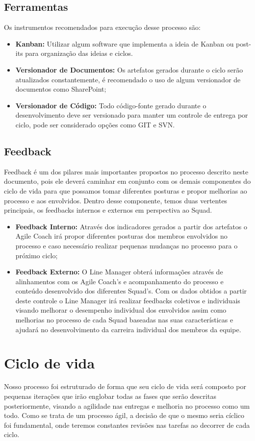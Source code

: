 \documentclass[	DIV=calc,%
							paper=a4,%
							fontsize=12pt,%
							onecolumn]{scrartcl}	 					%
\begin{document}
\subsection{Ferramentas}
Os instrumentos recomendados para execução desse processo são:
\begin{itemize}
	\item \textbf{Kanban:} Utilizar algum software que implementa a ideia de Kanban ou post-its para organização das ideias e ciclos.
	\item \textbf{Versionador de Documentos:} Os artefatos gerados durante o ciclo serão atualizados constantemente, é recomendado o uso de algum versionador de documentos como SharePoint; 
	\item \textbf{Versionador de Código:} Todo código-fonte gerado durante o desenvolvimento deve ser versionado para manter um controle de entrega por ciclo, pode ser considerado opções como GIT e SVN.
\end{itemize}	

\subsection{Feedback}
Feedback é um dos pilares mais importantes propostos no processo descrito neste documento, pois ele deverá caminhar em conjunto com os demais componentes do ciclo de vida para que possamos tomar diferentes posturas e propor melhorias ao processo e aos envolvidos. Dentro desse componente, temos duas vertentes principais, os feedbacks internos e externos em perspectiva ao Squad. 
\begin{itemize}
	\item \textbf{Feedback Interno:} Através dos indicadores gerados a partir dos artefatos o Agile Coach irá propor diferentes posturas dos membros envolvidos no processo e caso necessário realizar pequenas mudanças no processo para o próximo ciclo;
	\item \textbf{Feedback Externo:} O Line Manager obterá informações através de alinhamentos com os Agile Coach’s e acompanhamento do processo e conteúdo desenvolvido dos diferentes Squad’s.  Com os dados obtidos a partir deste controle o Line Manager irá realizar feedbacks coletivos e individuais visando melhorar o desempenho individual dos envolvidos assim como melhorias no processo de cada Squad baseadas nas suas características e ajudará no desenvolvimento da carreira individual dos membros da equipe. 
\end{itemize}	


\section{Ciclo de vida}
Nosso processo foi estruturado de forma que seu ciclo de vida será composto por pequenas iterações que irão englobar todas as fases que serão descritas posteriormente, visando a agilidade nas entregas e melhoria no processo como um todo. Como se trata de um processo ágil, a decisão de que o mesmo seria cíclico foi fundamental, onde teremos constantes revisões nas tarefas ao decorrer de cada ciclo.  
\end{document}

